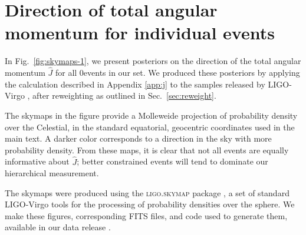 \documentclass[aps,prd,twocolumn,superscriptaddress,preprintnumbers,floatfix,nofootinbib]{revtex4-2}
\newcommand{\Nevents}{0}
\begin{document}
\section{Direction of total angular momentum for individual events}
\label{app:skymaps}

In Fig.~\ref{fig:skymaps-1}, we present posteriors on the direction of the total angular momentum $\hat{J}$ for all \Nevents events in our set.
We produced these posteriors by applying the calculation described in Appendix \ref{app:j} to the samples released by LIGO-Virgo \cite{zenodo:GWTC-2.1,zenodo:GWTC-3}, after reweighting as outlined in Sec.~\ref{sec:reweight}.

The skymaps in the figure provide a Molleweide projection of probability density over the Celestial, in the standard equatorial, geocentric coordinates used in the main text.
A darker color corresponds to a direction in the sky with more probability density.
From these maps, it is clear that not all events are equally informative about $\hat{J}$; better constrained events will tend to dominate our hierarchical measurement.

The skymaps were produced using the \textsc{ligo.skymap} package \cite{skymap,Singer:2016eax,Singer:2016erz}, a set of standard LIGO-Virgo tools for the processing of probability densities over the sphere.
We make these figures,  corresponding \ac{FITS} files, and code used to generate them, available in our data release \cite{repo}.



\end{document}

